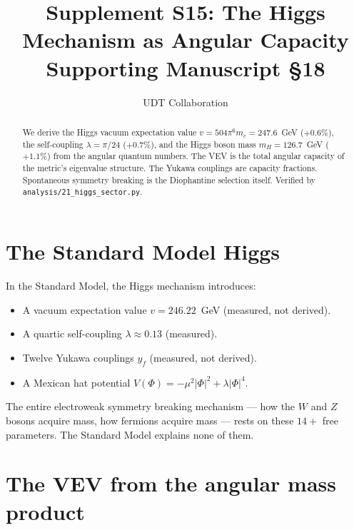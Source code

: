 \documentclass[11pt,letterpaper]{article}
\title{Supplement S15: The Higgs Mechanism as Angular Capacity \\
\large Supporting Manuscript \S18}
\author{UDT Collaboration}
\date{}
\numberwithin{equation}{section}
\begin{document}
\maketitle

\begin{abstract}
We derive the Higgs vacuum expectation value
$v = 504\pi^6 m_e = 247.6$~GeV ($+0.6\%$), the self-coupling
$\lambda = \pi/24$ ($+0.7\%$), and the Higgs boson mass
$m_H = 126.7$~GeV ($+1.1\%$) from the angular quantum numbers.  The
VEV is the total angular capacity of the metric's eigenvalue structure.
The Yukawa couplings are capacity fractions.  Spontaneous symmetry
breaking is the Diophantine selection itself.  Verified by
\texttt{analysis/21\_higgs\_sector.py}.
\end{abstract}

\tableofcontents

\section{The Standard Model Higgs}

In the Standard Model, the Higgs mechanism introduces:
\begin{itemize}
  \item A vacuum expectation value $v = 246.22$~GeV (measured, not derived).
  \item A quartic self-coupling $\lambda \approx 0.13$ (measured).
  \item Twelve Yukawa couplings $y_f$ (measured, not derived).
  \item A Mexican hat potential $V(\Phi) = -\mu^2|\Phi|^2 + \lambda|\Phi|^4$.
\end{itemize}
The entire electroweak symmetry breaking mechanism --- how the $W$ and
$Z$ bosons acquire mass, how fermions acquire mass --- rests on these
$14+$ free parameters.  The Standard Model explains none of them.

\section{The VEV from the angular mass product}
\end{document}
